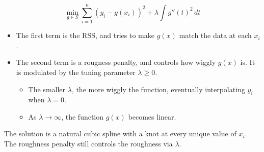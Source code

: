 $$\min_{g \in S} \sum_{i=1}^n (y_i - g(x_i))^2 + \lambda \int g''(t)^2 \, dt$$

\begin{itemize}
	\item The first term is the RSS, and tries to make $g(x)$ match the data at each $x_i$.
	\item The second term is a rougness penalty, and controls how wiggly $g(x)$ is. It is modulated by the tuning parameter $\lambda \geq 0$.
	      \begin{itemize}
		      \item The smaller $\lambda$, the more wiggly the function, eventually interpolating $y_i$ when $\lambda = 0$.
		      \item As $\lambda \rightarrow \infty$, the function $g(x)$ becomes linear.
	      \end{itemize}
\end{itemize}

The solution is a natural cubic spline with a knot at every unique value of $x_i$. The roughness penalty still controls the roughness via $\lambda$.

